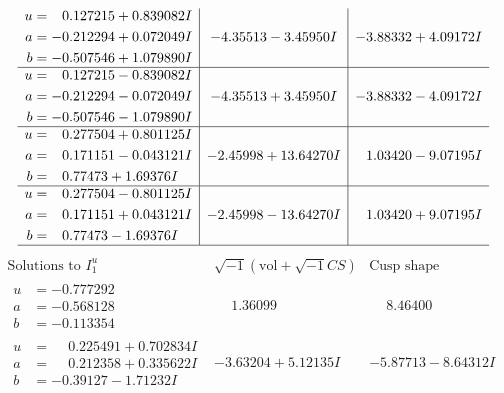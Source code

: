 \documentclass[1p]{elsarticle_modified}
\theoremstyle{definition}
\newcommand{\I}{\sqrt{-1}}
\begin{document}
$$\begin{array}{c|c|c}
\begin{aligned}
u &= \phantom{-}0.127215 + 0.839082 I \\
a &= -0.212294 + 0.072049 I \\
b &= -0.507546 + 1.079890 I\end{aligned}
 & -4.35513 - 3.45950 I & -3.88332 + 4.09172 I \\ \hline\begin{aligned}
u &= \phantom{-}0.127215 - 0.839082 I \\
a &= -0.212294 - 0.072049 I \\
b &= -0.507546 - 1.079890 I\end{aligned}
 & -4.35513 + 3.45950 I & -3.88332 - 4.09172 I \\ \hline\begin{aligned}
u &= \phantom{-}0.277504 + 0.801125 I \\
a &= \phantom{-}0.171151 - 0.043121 I \\
b &= \phantom{-}0.77473 + 1.69376 I\end{aligned}
 & -2.45998 + 13.64270 I & \phantom{-}1.03420 - 9.07195 I \\ \hline\begin{aligned}
u &= \phantom{-}0.277504 - 0.801125 I \\
a &= \phantom{-}0.171151 + 0.043121 I \\
b &= \phantom{-}0.77473 - 1.69376 I\end{aligned}
 & -2.45998 - 13.64270 I & \phantom{-}1.03420 + 9.07195 I\\
 \hline 
 \end{array}$$\newpage$$\begin{array}{c|c|c}  
\text{Solutions to }I^u_{1}& \I (\text{vol} + \sqrt{-1}CS) & \text{Cusp shape}\\
 \hline 
\begin{aligned}
u &= -0.777292\phantom{ +0.000000I} \\
a &= -0.568128\phantom{ +0.000000I} \\
b &= -0.113354\phantom{ +0.000000I}\end{aligned}
 & \phantom{-}1.36099\phantom{ +0.000000I} & \phantom{-}8.46400\phantom{ +0.000000I} \\ \hline\begin{aligned}
u &= \phantom{-}0.225491 + 0.702834 I \\
a &= \phantom{-}0.212358 + 0.335622 I \\
b &= -0.39127 - 1.71232 I\end{aligned}
 & -3.63204 + 5.12135 I & -5.87713 - 8.64312 I \\ \hline\begin{aligned}

\end{aligned}
\end{array}$$
\end{document}
